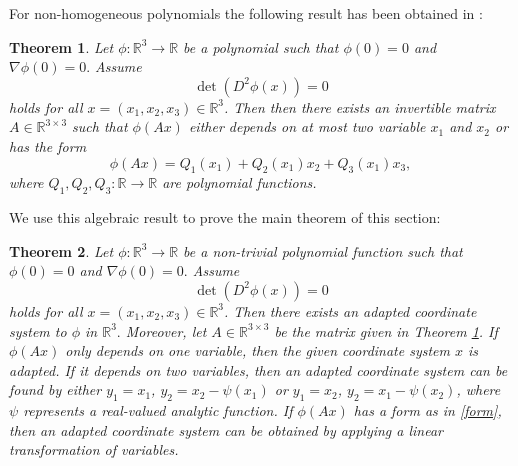 \documentclass[a4paper, 11pt]{article}
\theoremstyle{plain}
\newtheorem{theorem}{Theorem}[section]
\theoremstyle{definition}
\theoremstyle{lemma}
\theoremstyle{Remark}
\theoremstyle{proposition}
\theoremstyle{corollary}
\theoremstyle{example}
\theoremstyle{assumption}
\begin{document}
For non-homogeneous polynomials  the following result has been obtained in \cite[Theorem 3.3]{Bondt}:
\begin{theorem}\label{Bon}
Let  $\phi:\mathbb{R}^3\to \mathbb{R}$ be a  polynomial  such that $\phi(0)=0$ and $\nabla \phi(0)=0.$ Assume  $$\det{(D^2\phi(x))}=0$$
holds   for all $x=(x_1,x_2,x_3)\in \mathbb{R}^3$.  Then
then there exists an  invertible matrix $A\in \mathbb{R}^{3\times 3}$ such that $\phi(Ax)$ either depends on at most two  variable $x_1$ and $x_2$ or has the form
\begin{equation}\label{form}
\phi(Ax)=Q_1(x_1)+Q_2(x_1)x_2+Q_3(x_1)x_3,
\end{equation}
where $Q_1,Q_2,Q_3:\mathbb{R}\to \mathbb{R}$ are polynomial functions.
\end{theorem}
We use this algebraic result to prove the main theorem of this section:
\begin{theorem}\label{th:adap}
Let  $\phi:\mathbb{R}^3\to \mathbb{R}$ be a non-trivial polynomial function such that $\phi(0)=0$ and $\nabla \phi(0)=0.$  Assume $$\det{(D^2\phi(x))}=0$$
holds  for all $x=(x_1,x_2,x_3)\in \mathbb{R}^3$.   Then there exists an adapted coordinate system to $\phi$ in $\mathbb{R}^3.$ Moreover, let  $A\in \mathbb{R}^{3\times 3}$ be the matrix given in  Theorem \ref{Bon}. If $\phi(Ax)$ only depends on one variable, then the given coordinate  system $x$ is adapted. If it depends on two variables, then an adapted coordinate system can be found by either $y_1 = x_1$, $y_2 = x_2 - \psi(x_1)$ or $y_1 = x_2$, $y_2 = x_1 - \psi(x_2)$, where $\psi$ represents a real-valued analytic function. If $\phi(Ax)$ has a form as in \eqref{form}, then an adapted coordinate system can be obtained   by applying a linear transformation of variables.
\end{theorem}
\end{document}
